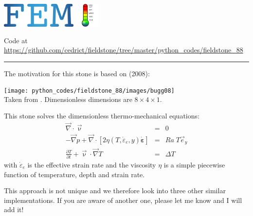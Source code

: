 \includegraphics[height=1.25cm]{images/pictograms/FEM}
\includegraphics[height=1.25cm]{images/pictograms/temperature}




\begin{center}
Code at \url{https://github.com/cedrict/fieldstone/tree/master/python_codes/fieldstone_88}
\end{center}

\par\noindent\rule{\textwidth}{0.4pt}

The motivation for this stone is based on \textcite{bugg08} (2008):

\begin{center}
\texttt{[image: python\_codes/fieldstone\_88/images/bugg08]}\\
{\captionfont Taken from \cite{bugg08}. Dimensionless dimensions are $8\times 4 \times 1$.}
\end{center}

This stone solves the dimensionless thermo-mechanical equations:
\begin{eqnarray}
\vec\nabla\cdot\vec\upnu &=& 0 \\
-\vec\nabla p + \vec\nabla \cdot [ 2 \eta(T,\dot{\varepsilon}_e,y) \dot{\bm \varepsilon} ] &=& Ra\; T \vec{e}_y \\
\frac{\partial T}{\partial t} + \vec\upnu \cdot \vec\nabla T &=& \Delta T
\end{eqnarray}
with $\dot{\varepsilon}_e$ is the effective strain rate and the viscosity $\eta$ is a simple
piecewise function of temperature, depth and strain rate.

This approach is not unique and we therefore look into three other similar implementations.
If you are aware of another one, please let me know and I will add it!

\newpage
